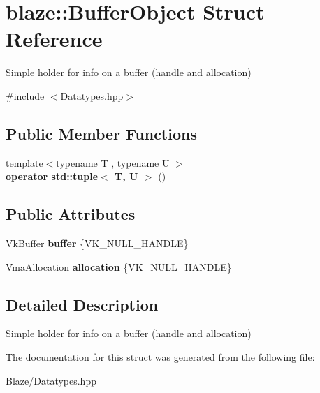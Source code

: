 \hypertarget{structblaze_1_1BufferObject}{}\section{blaze\+:\+:Buffer\+Object Struct Reference}
\label{structblaze_1_1BufferObject}


Simple holder for info on a buffer (handle and allocation)  




{\ttfamily \#include $<$Datatypes.\+hpp$>$}

\subsection*{Public Member Functions}
\begin{DoxyCompactItemize}
\item 
\mbox{\label{structblaze_1_1BufferObject_a116bd5144fd35aafd83736bbccad68f8}} 
{\footnotesize template$<$typename T , typename U $>$ }\\{\bfseries operator std\+::tuple$<$ T, U $>$} ()
\end{DoxyCompactItemize}
\subsection*{Public Attributes}
\begin{DoxyCompactItemize}
\item 
\mbox{\label{structblaze_1_1BufferObject_a35824881dd4b1de27557989b363bf3c4}} 
Vk\+Buffer {\bfseries buffer} \{V\+K\+\_\+\+N\+U\+L\+L\+\_\+\+H\+A\+N\+D\+LE\}
\item 
\mbox{\label{structblaze_1_1BufferObject_ab8ef397b2bd0e1c9fc1984e4bf6bc287}} 
Vma\+Allocation {\bfseries allocation} \{V\+K\+\_\+\+N\+U\+L\+L\+\_\+\+H\+A\+N\+D\+LE\}
\end{DoxyCompactItemize}


\subsection{Detailed Description}
Simple holder for info on a buffer (handle and allocation) 

The documentation for this struct was generated from the following file\+:\begin{DoxyCompactItemize}
\item 
Blaze/Datatypes.\+hpp\end{DoxyCompactItemize}
